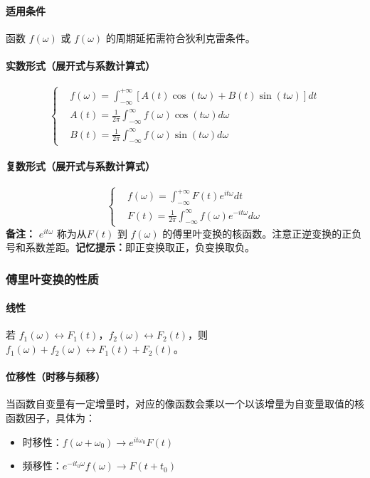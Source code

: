 \documentclass{article}
\begin{document}
	\paragraph{适用条件}
	函数 \( f(\omega) \) 或 \( f(\omega) \) 的周期延拓需符合狄利克雷条件。
	
	\paragraph{实数形式（展开式与系数计算式）}
	\[
	\left\{
	\begin{aligned}
		&f(\omega) = \int_{-\infty}^{+\infty} \left[ A(t) \cos(t \omega) + B(t) \sin(t \omega) \right] dt \\
		&A(t) = \frac{1}{2\pi} \int_{-\infty}^{\infty} f(\omega) \cos(t \omega) d\omega \\
		&B(t) = \frac{1}{2\pi} \int_{-\infty}^{\infty} f(\omega) \sin(t \omega) d\omega
	\end{aligned}
	\right.
	\]
	
	\paragraph{复数形式（展开式与系数计算式）}
	\[
	\left\{
	\begin{aligned}
		&f(\omega) = \int_{-\infty}^{+\infty} F(t) e^{it \omega} dt \\
		&F(t) = \frac{1}{2\pi} \int_{-\infty}^{\infty} f(\omega) e^{-it \omega} d\omega
	\end{aligned}
	\right.
	\]
	\textbf{备注：}  \( e^{it \omega} \) 称为从\( F(t) \) 到  \( f(\omega) \)  的傅里叶变换的核函数。注意正逆变换的正负号和系数差距。\textbf{记忆提示：}即正变换取正，负变换取负。
	
	\subsubsection{傅里叶变换的性质}
	
	\paragraph{线性}
	若 \( f_1(\omega) \leftrightarrow F_1(t) \)，\( f_2(\omega) \leftrightarrow F_2(t) \)，则 \( f_1(\omega) + f_2(\omega) \leftrightarrow F_1(t) + F_2(t) \)。
	
	\paragraph{位移性（时移与频移）}
	当函数自变量有一定增量时，对应的像函数会乘以一个以该增量为自变量取值的核函数因子，具体为：
	\begin{itemize}
		\item 时移性：\( f(\omega + \omega_0) \to e^{it \omega_0} F(t) \)
		\item 频移性：\( e^{-it_0 \omega} f(\omega) \to F(t + t_0) \)
	\end{itemize}
	
\end{document}
